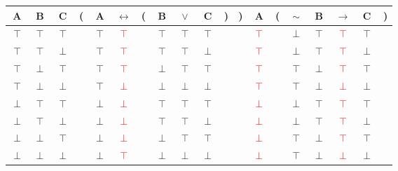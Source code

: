\documentclass[11pt]{article}
\begin{document}
\vspace{2em}

\begin{tabular}{ c  c  c | c  c  c  c  c  c  c  c  c | c | c  c  c  c  c  c }
A & B & C & ( & A & $\leftrightarrow$ & ( & B & $\lor$ & C & ) & ) & A & ( & $\sim$ & B & $\rightarrow$ & C & )\\
\hline 
$\top$ & $\top$ & $\top$ &  & $\top$ & \textcolor{red}{$\top$} &  & $\top$ & $\top$ & $\top$ &  &  & \textcolor{red}{$\top$} &  & $\perp$ & $\top$ & \textcolor{red}{$\top$} & $\top$ & \\
$\top$ & $\top$ & $\perp$ &  & $\top$ & \textcolor{red}{$\top$} &  & $\top$ & $\top$ & $\perp$ &  &  & \textcolor{red}{$\top$} &  & $\perp$ & $\top$ & \textcolor{red}{$\top$} & $\perp$ & \\
$\top$ & $\perp$ & $\top$ &  & $\top$ & \textcolor{red}{$\top$} &  & $\perp$ & $\top$ & $\top$ &  &  & \textcolor{red}{$\top$} &  & $\top$ & $\perp$ & \textcolor{red}{$\top$} & $\top$ & \\
$\top$ & $\perp$ & $\perp$ &  & $\top$ & \textcolor{red}{$\perp$} &  & $\perp$ & $\perp$ & $\perp$ &  &  & \textcolor{red}{$\top$} &  & $\top$ & $\perp$ & \textcolor{red}{$\perp$} & $\perp$ & \\
$\perp$ & $\top$ & $\top$ &  & $\perp$ & \textcolor{red}{$\perp$} &  & $\top$ & $\top$ & $\top$ &  &  & \textcolor{red}{$\perp$} &  & $\perp$ & $\top$ & \textcolor{red}{$\top$} & $\top$ & \\
$\perp$ & $\top$ & $\perp$ &  & $\perp$ & \textcolor{red}{$\perp$} &  & $\top$ & $\top$ & $\perp$ &  &  & \textcolor{red}{$\perp$} &  & $\perp$ & $\top$ & \textcolor{red}{$\top$} & $\perp$ & \\
$\perp$ & $\perp$ & $\top$ &  & $\perp$ & \textcolor{red}{$\perp$} &  & $\perp$ & $\top$ & $\top$ &  &  & \textcolor{red}{$\perp$} &  & $\top$ & $\perp$ & \textcolor{red}{$\top$} & $\top$ & \\
$\perp$ & $\perp$ & $\perp$ &  & $\perp$ & \textcolor{red}{$\top$} &  & $\perp$ & $\perp$ & $\perp$ &  &  & \textcolor{red}{$\perp$} &  & $\top$ & $\perp$ & \textcolor{red}{$\perp$} & $\perp$ & \\
\end{tabular}

\vspace{2em}
\end{document}
